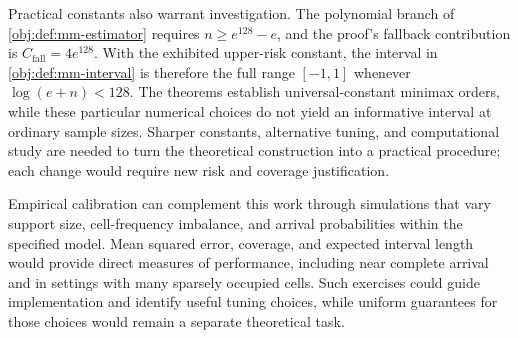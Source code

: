 Practical constants also warrant investigation. The polynomial branch of \cref{obj:def:mm-estimator} requires \(n\ge e^{128}-e\), and the proof's fallback contribution is \(C_{\mathrm{fall}}=4e^{128}\). With the exhibited upper-risk constant, the interval in \cref{obj:def:mm-interval} is therefore the full range \([-1,1]\) whenever \(\log(e+n)<128\). The theorems establish universal-constant minimax orders, while these particular numerical choices do not yield an informative interval at ordinary sample sizes. Sharper constants, alternative tuning, and computational study are needed to turn the theoretical construction into a practical procedure; each change would require new risk and coverage justification.

Empirical calibration can complement this work through simulations that vary support size, cell-frequency imbalance, and arrival probabilities within the specified model. Mean squared error, coverage, and expected interval length would provide direct measures of performance, including near complete arrival and in settings with many sparsely occupied cells. Such exercises could guide implementation and identify useful tuning choices, while uniform guarantees for those choices would remain a separate theoretical task.

